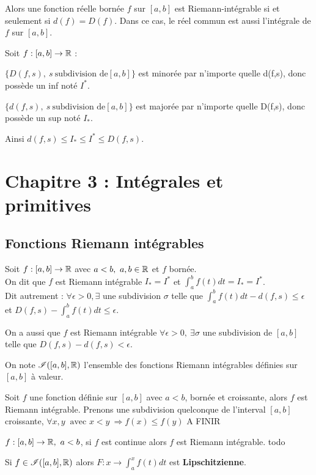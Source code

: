 Alors une fonction réelle bornée $f$ sur $[a,b]$ est Riemann-intégrable si et seulement si $d(f)=D(f)$. Dans ce cas, le réel commun est aussi l'intégrale de $f$ sur $[a,b]$.

Soit $f : [a,b] \to \mathbb{R}$ :
\bi
\item $\{ D(f,s), ~ s ~ \text{subdivision de} [a,b] \}$ est minorée par n'importe quelle d(f,s), donc possède un inf noté $I^*$.
\item $\{ d(f,s), ~ s ~ \text{subdivision de} [a,b] \}$ est majorée par n'importe quelle D(f,s), donc possède un sup noté $I_*$.
\ei

Ainsi $d(f,s) \leq I_* \leq I^* \leq D(f,s)$.

\newpage

\section{Chapitre 3 : Intégrales et primitives}
\subsection{Fonctions Riemann intégrables}
Soit $f : [a,b] \to \mathbb{R}$ avec $a<b, ~ a,b \in \mathbb{R}$ et $f$ bornée. \\ On dit que $f$ est Riemann intégrable  \ssi $I_* = I^*$ et $\int_a^b f(t)dt = I_* = I^*$.\\
Dit autrement : $\forall \epsilon > 0, \exists$ une subdivision $\sigma$ telle que $\int_a^b f(t)dt - d(f,s) \leq \epsilon$ et $D(f,s) - \int_a^b f(t)dt \leq \epsilon$.

On a aussi que $f$ est Riemann intégrable \ssi $\forall \epsilon > 0, ~ \exists \sigma$ une subdivision de $[a,b]$ telle que $D(f,s) - d(f,s) < \epsilon$.
\ed

\bn
On note $\mathscr{I}([a,b],\mathbb{R})$ l'ensemble des fonctions Riemann intégrables définies sur $[a,b]$ à valeur.
\en

\medskip

\bp
Soit $f$ une fonction définie sur $[a,b]$ avec $a<b$, bornée et croissante, alors $f$ est Riemann intégrable.
\ep
\bpf
Prenons une subdivision quelconque de l'interval $[a,b]$ croissante, \ie $\forall x,y ~\text{ avec } x<y ~ \Rightarrow f(x) \leq f(y)$
A FINIR
\epf

\bp
$f : [a,b] \to \mathbb{R}, ~ a<b$, si $f$ est continue alors $f$ est Riemann intégrable.
\ep
\bpf
todo
\epf

\bigskip

\bp
Si $f \in \mathscr{I}([a,b],\mathbb{R})$ alors $F : x \to \int_a^x f(t)dt$ est \textbf{Lipschitzienne}.
\ep

